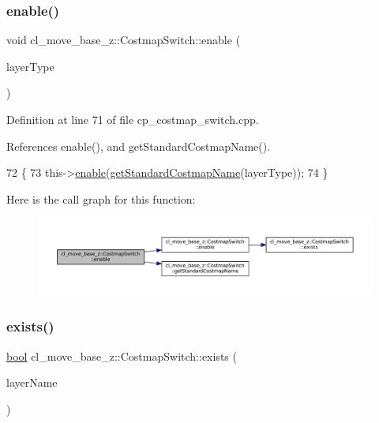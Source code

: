 \subsubsection{\texorpdfstring{enable()}{enable()}\hspace{0.1cm}{\footnotesize\ttfamily [2/2]}}
{\footnotesize\ttfamily void cl\+\_\+move\+\_\+base\+\_\+z\+::\+Costmap\+Switch\+::enable (\begin{DoxyParamCaption}\item[{\hyperlink{classcl__move__base__z_1_1CostmapSwitch_af38aeee5e3893e689cd74ddddfe0df15}{Standard\+Layers}}]{layer\+Type }\end{DoxyParamCaption})}



Definition at line 71 of file cp\+\_\+costmap\+\_\+switch.\+cpp.



References enable(), and get\+Standard\+Costmap\+Name().


\begin{DoxyCode}
72 \{
73     this->\hyperlink{classcl__move__base__z_1_1CostmapSwitch_ad2366ec89f6cb922b6d4a6c8d2627e97}{enable}(\hyperlink{classcl__move__base__z_1_1CostmapSwitch_ac46796874242fdaa7efef86b66a55102}{getStandardCostmapName}(layerType));
74 \}
\end{DoxyCode}
Here is the call graph for this function\+:
\nopagebreak
\begin{figure}[H]
\begin{center}
\leavevmode
\includegraphics[width=350pt]{classcl__move__base__z_1_1CostmapSwitch_ac30d812503a62ea594587d8ab552d7c3_cgraph}
\end{center}
\end{figure}
\mbox{\label{classcl__move__base__z_1_1CostmapSwitch_ae9cfc1152e625763beb7997c5dbed70b}} 
\subsubsection{\texorpdfstring{exists()}{exists()}}
{\footnotesize\ttfamily \hyperlink{classbool}{bool} cl\+\_\+move\+\_\+base\+\_\+z\+::\+Costmap\+Switch\+::exists (\begin{DoxyParamCaption}\item[{std\+::string}]{layer\+Name }\end{DoxyParamCaption})}



